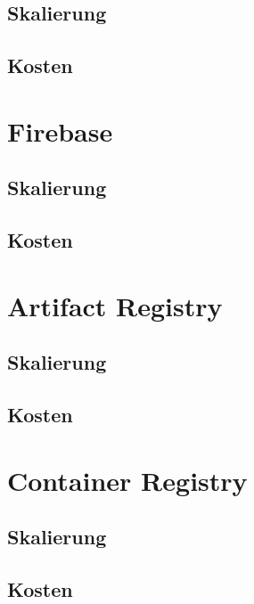 \subsection*{Skalierung}
\blindtext

\subsection*{Kosten}
\sblindtext


\section{Firebase}
\blindtext

\subsection*{Skalierung}
\blindtext

\subsection*{Kosten}
\sblindtext


\section{Artifact Registry}
\blindtext

\subsection*{Skalierung}
\blindtext

\subsection*{Kosten}
\sblindtext


\section{Container Registry}
\blindtext

\subsection*{Skalierung}
\blindtext

\subsection*{Kosten}
\sblindtext


